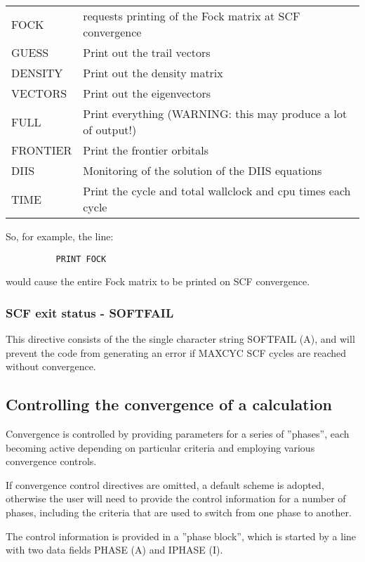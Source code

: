 \documentclass[11pt,fleqn]{article}
\begin{document}
\begin{tabular}{ll}
\\ \hline
FOCK &  requests printing of the Fock matrix at SCF convergence \\
GUESS & Print out the trail vectors\\
DENSITY & Print out the density matrix\\
VECTORS & Print out the eigenvectors\\
FULL & Print everything (WARNING: this may produce a lot of output!)\\
FRONTIER & Print the frontier orbitals\\
DIIS & Monitoring of the solution of the DIIS equations\\
TIME & Print the cycle and total wallclock and cpu times each cycle\\ \hline
\end{tabular}

So, for example, the line:

{
\footnotesize
\begin{verbatim}
          PRINT FOCK
\end{verbatim}
}

would cause the entire Fock matrix to be printed on SCF convergence.

\subsubsection{SCF exit status - SOFTFAIL}
This directive consists of the the single character string SOFTFAIL
(A), and will prevent the code from generating an error if MAXCYC SCF
cycles are reached without convergence.

\subsection[Controlling the convergence of a calculation]{Controlling the convergence of a calculation}
Convergence is controlled by providing parameters for a series of
''phases'', each becoming active depending on particular criteria and
employing various convergence controls.

If convergence control directives are omitted, a default scheme is
adopted, otherwise the user will need to provide the control
information for a number of phases, including the criteria that are
used to switch from one phase to another.

The control information is provided in a ''phase block'', which is
started by a line with two data fields PHASE (A) and IPHASE (I).
\end{document}
